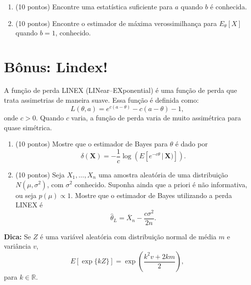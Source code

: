 \documentclass[a4paper,10pt, notitlepage]{report}
\newcommand{\bX}{\boldsymbol{X}} %
\newif\ifanswers
\begin{document}
\begin{enumerate}[label=\alph*)]
 \item (10 pontos) Encontre uma estatística suficiente para $a$ quando $b$ é conhecida.
 \item (10 pontos) Encontre o estimador de máxima verossimilhança para $E_\theta[X]$ quando $b = 1$, conhecido.
 \end{enumerate}
\ifanswers

\fi

\section*{Bônus: Lindex!}

A função de perda LINEX (LINear--EXponential) é uma função de perda que trata assimetrias de maneira suave.
Essa função é definida como:
\[ L(\theta, a) = e^{c(a-\theta)} - c(a-\theta) -1, \]
onde $c>0$.
Quando $c$ varia, a função de perda varia de muito assimétrica para quase simétrica.
\begin{enumerate}[label=\alph*)]
\item (10 pontos) Mostre que o estimador de Bayes para $\theta$ é dado por 
\begin{equation*}
    \delta(\bX) = -\frac{1}{c} \log \left( E\left[e^{-c\theta} \, | \, \bX) \right] \right).
\end{equation*}
\item (10 pontos) Seja $X_1,\ldots,X_n$ uma amostra aleatória de uma distribuição $N(\mu,\sigma^2)$, com $\sigma^2$ conhecido.
Suponha ainda que a priori é não informativa, ou seja $p(\mu) \propto 1$.
Mostre que o estimador de Bayes utilizando a perda LINEX é 
\[\widehat{\theta}_L = \overline{X}_n - \frac{c \sigma^2}{2n}.\]
\end{enumerate}
\textbf{Dica:} Se $Z$ é uma variável aleatória com distribuição normal de média $m$ e variância $v$,
\begin{equation*}
    E[\exp\{kZ\}] = \exp\left(\frac{k^2v + 2km}{2}\right),
\end{equation*}
para $k \in \mathbb{R}$.
\ifanswers

\fi

% 
% 
\end{document}
